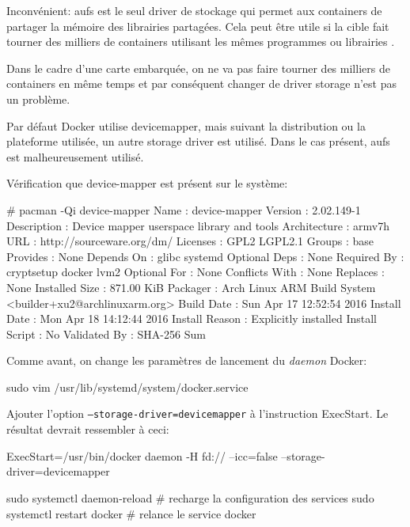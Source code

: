 \documentclass[11pt,a4paper,oneside]{report}
\newcommand{\code}[1]{\texttt{#1}}
\begin{document}
Inconvénient: aufs est le seul driver de stockage qui permet aux containers de partager la mémoire des librairies partagées. Cela peut être utile si la cible fait tourner des milliers de containers utilisant les mêmes programmes ou librairies \cite{cis_benchmark}.

Dans le cadre d'une carte embarquée, on ne va pas faire tourner des milliers de containers en même temps et par conséquent changer de driver storage n'est pas un problème.

Par défaut Docker utilise devicemapper, mais suivant la distribution ou la plateforme utilisée, un autre storage driver est utilisé. Dans le cas présent, aufs est malheureusement utilisé.

Vérification que device-mapper est présent sur le système:

\begin{bashcode}
# pacman -Qi device-mapper
Name            : device-mapper
Version         : 2.02.149-1
Description     : Device mapper userspace library and tools
Architecture    : armv7h
URL             : http://sourceware.org/dm/
Licenses        : GPL2  LGPL2.1
Groups          : base
Provides        : None
Depends On      : glibc  systemd
Optional Deps   : None
Required By     : cryptsetup  docker  lvm2
Optional For    : None
Conflicts With  : None
Replaces        : None
Installed Size  : 871.00 KiB
Packager        : Arch Linux ARM Build System <builder+xu2@archlinuxarm.org>
Build Date      : Sun Apr 17 12:52:54 2016
Install Date    : Mon Apr 18 14:12:44 2016
Install Reason  : Explicitly installed
Install Script  : No
Validated By    : SHA-256 Sum
\end{bashcode}

Comme avant, on change les paramètres de lancement du \textit{daemon} Docker:

\begin{bashcode}
sudo vim /usr/lib/systemd/system/docker.service
\end{bashcode}

Ajouter l'option \code{--storage-driver=devicemapper} à l'instruction ExecStart. Le résultat devrait ressembler à ceci:

\begin{bashcode}
ExecStart=/usr/bin/docker daemon -H fd:// --icc=false --storage-driver=devicemapper
\end{bashcode}

\begin{bashcode}
sudo systemctl daemon-reload # recharge la configuration des services
sudo systemctl restart docker # relance le service docker
\end{bashcode}
\end{document}
